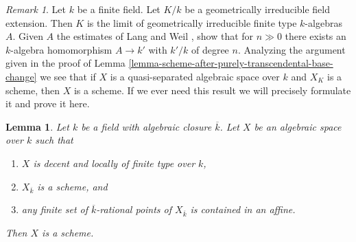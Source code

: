 \documentclass{stacks-project}
\theoremstyle{plain}
\newtheorem{lemma}[subsection]{Lemma}
\theoremstyle{definition}
\theoremstyle{remark}
\newtheorem{remark}[subsection]{Remark}
\numberwithin{equation}{subsection}
\begin{document}
\begin{remark}
\label{remark-when-does-the-argument-work}
Let $k$ be a finite field. Let $K/k$ be a geometrically
irreducible field extension. Then $K$ is the limit of geometrically
irreducible finite type $k$-algebras $A$. Given $A$ the estimates
of Lang and Weil \cite{LW}, show that for $n \gg 0$ there exists
an $k$-algebra homomorphism $A \to k'$ with $k'/k$ of degree $n$.
Analyzing the argument given in the proof of
Lemma \ref{lemma-scheme-after-purely-transcendental-base-change}
we see that if $X$ is a quasi-separated algebraic space over $k$
and $X_K$ is a scheme, then $X$ is a scheme. If we ever need this
result we will precisely formulate it and prove it here.
\end{remark}

\begin{lemma}
\label{lemma-scheme-over-algebraic-closure-enough-affines}
Let $k$ be a field with algebraic closure $\overline{k}$. Let $X$
be an algebraic space over $k$ such that
\begin{enumerate}
\item $X$ is decent and locally of finite type over $k$,
\item $X_{\overline{k}}$ is a scheme, and
\item any finite set of $\overline{k}$-rational points of $X_{\overline{k}}$
is contained in an affine.
\end{enumerate}
Then $X$ is a scheme.
\end{lemma}
\end{document}
